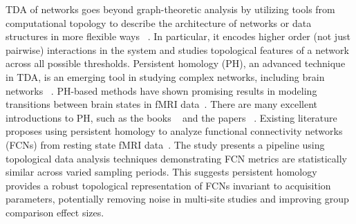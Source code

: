 %



%
TDA of networks goes beyond graph-theoretic analysis by utilizing tools from computational topology to describe the architecture of networks or data structures in more flexible ways ~\cite{Topology_and_data, ghrist2008barcodes}. In particular, it encodes higher order (not just pairwise) interactions in the system and studies topological features of a network across all possible thresholds. Persistent homology (PH), an advanced technique in TDA, is an emerging tool in studying complex networks, including brain networks ~\cite{5872535, 7164127, 10.1371/journal.pcbi.1002581}. PH-based methods have shown promising results in modeling transitions between brain states in fMRI data~\cite{Saggar2018}. There are many excellent introductions to PH, such as the books ~\cite{ghrist2014elementary, oudot2015persistence, zomorodian2005topology} and the papers ~\cite{patania2017topological, Topology_and_data, edelsbrunner2008surveys, ghrist2008barcodes, weinberger2011persistent}. Existing literature proposes using persistent homology to analyze functional connectivity networks (FCNs) from resting state fMRI data~\cite{kumar2023robustness}. The study presents a pipeline using topological data analysis techniques demonstrating FCN metrics are statistically similar across varied sampling periods. This suggests persistent homology provides a robust topological representation of FCNs invariant to acquisition parameters, potentially removing noise in multi-site studies and improving group comparison effect sizes. 

